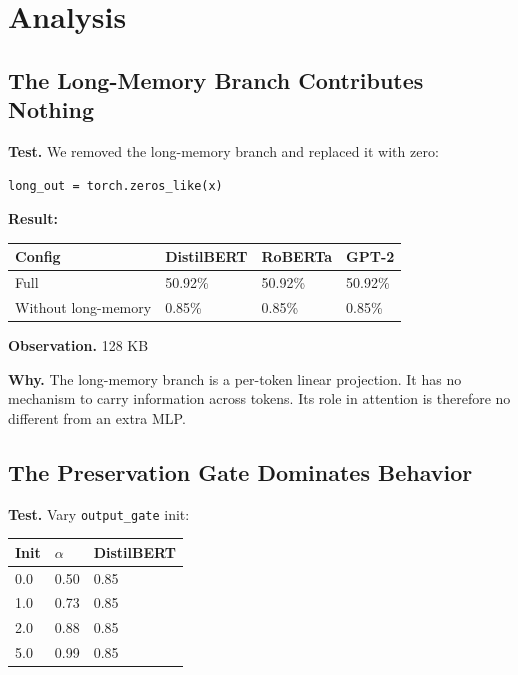 
\section{Analysis}

\subsection{The Long-Memory Branch Contributes Nothing}

\textbf{Test.} We removed the long-memory branch and replaced it with zero:

\begin{lstlisting}
long_out = torch.zeros_like(x)
\end{lstlisting}

\textbf{Result:}

\begin{table}[H]
\centering
\small
\begin{tabular}{llll}
\toprule
\textbf{Config} & \textbf{DistilBERT} & \textbf{RoBERTa} & \textbf{GPT-2} \\
\midrule
Full & 50.92\% & 50.92\% & 50.92\% \\
Without long-memory & 0.85\% & 0.85\% & 0.85\% \\
\bottomrule
\end{tabular}
\end{table}

\textbf{Observation.} 128 KB

\textbf{Why.} The long-memory branch is a per-token linear projection. It has no 
mechanism to carry information across tokens. Its role in attention is 
therefore no different from an extra MLP.

\subsection{The Preservation Gate Dominates Behavior}

\textbf{Test.} Vary \texttt{output\_gate} init:

\begin{table}[H]
\centering
\small
\begin{tabular}{lll}
\toprule
\textbf{Init} & \textbf{$\alpha$} & \textbf{DistilBERT} \\
\midrule
0.0 & 0.50 & 0.85 \\
1.0 & 0.73 & 0.85 \\
2.0 & 0.88 & 0.85 \\
5.0 & 0.99 & 0.85 \\
\bottomrule
\end{tabular}
\end{table}

